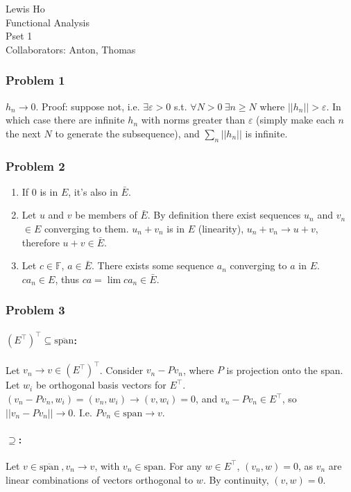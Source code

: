 \documentclass[11pt]{article}
\newcommand{\s}{\text{span}}
\newcommand{\etop}{(E^\top)^\top}
\begin{document}
\begin{flushleft}
  Lewis Ho\\
  Functional Analysis\\
  Pset 1\\
  Collaborators: Anton, Thomas
\end{flushleft}

\subsubsection*{Problem 1}


$h_n \to 0$. Proof: suppose not, i.e. $\exists \varepsilon > 0$ s.t.
$\forall N > 0~\exists n \geq N$ where $||h_n|| > \varepsilon$. In which case
there are infinite $h_n$ with norms greater than $\varepsilon$ (simply make
each $n$ the next $N$ to generate the subsequence), and $\sum_n ||h_n||$ is
infinite.

\subsubsection*{Problem 2}
\begin{enumerate}
\item If 0 is in $E$, it's also in $\bar{E}$.
\item Let $u$ and $v$ be members of $\bar{E}$. By definition there exist
  sequences $u_n$ and $v_n$ $\in E$ converging to them. $u_n + v_n$
  is in $E$ (linearity), $u_n + v_n \to u + v$, therefore $u + v \in \bar{E}$.
\item Let $c \in \mathbb{F}$, $a \in \bar{E}$. There exists some sequence $a_n$
  converging to $a$ in $E$. $ca_n \in E$, thus $ca = \lim ca_n \in \bar{E}$. 
\end{enumerate}

\subsubsection*{Problem 3}

\paragraph{$(E^\top)^\top \subseteq \overline{\s}$:}
Let $v_n \to v \in \etop$.
Consider $v_n - Pv_n$, where $P$ is
projection onto the span. Let $w_i$ be orthogonal basis vectors for $E^\top$.
$(v_n - Pv_n, w_i) = (v_n, w_i) \to (v, w_i) = 0$, and $v_n - Pv_n \in E^\top$,
so $||v_n - Pv_n|| \to 0$. I.e. $Pv_n \in \s \to v$.

\paragraph{$\supseteq$:}
Let $v \in \overline{\s}~, v_n \to v$, with $v_n \in \s$. For any $w
\in E^\top$, $(v_n, w) = 0$, as $v_n$ are linear combinations of vectors
orthogonal to $w$. By continuity, $(v,w) = 0$.
\end{document}
